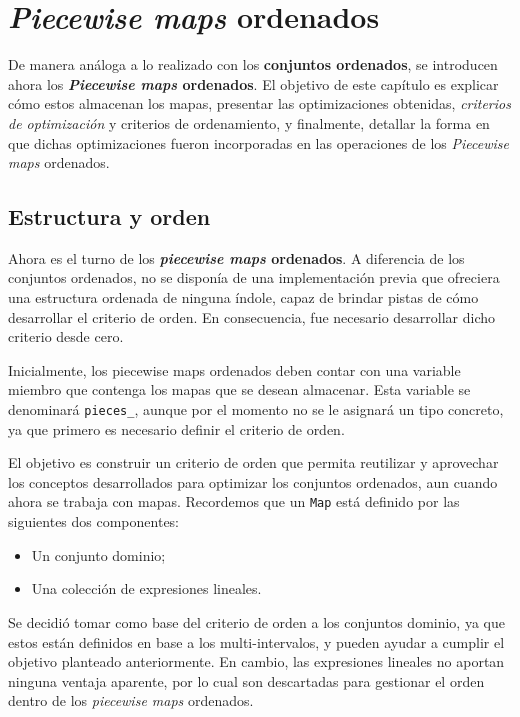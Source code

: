 \chapter{\textit{Piecewise maps} ordenados}

De manera análoga a lo realizado con los \textbf{conjuntos ordenados}, 
se introducen ahora los \textbf{\textit{Piecewise maps} ordenados}. 
El objetivo de este capítulo es explicar cómo estos almacenan los mapas, 
presentar las optimizaciones obtenidas, \textit{criterios de optimización} y criterios de ordenamiento, y finalmente, detallar la forma en que 
dichas optimizaciones fueron incorporadas en las operaciones de los \textit{Piecewise maps} ordenados.

\section{Estructura y orden}

Ahora es el turno de los \textbf{\textit{piecewise maps} ordenados}. A diferencia de los conjuntos ordenados, no se disponía de una implementación previa que ofreciera una estructura ordenada de ninguna índole, capaz de brindar pistas de cómo desarrollar el criterio de orden. En consecuencia, fue necesario desarrollar dicho criterio desde cero.

Inicialmente, los piecewise maps ordenados deben contar con una variable miembro que contenga los mapas que se desean almacenar. Esta variable se denominará \texttt{pieces\_}, aunque por el momento no se le asignará un tipo concreto, ya que primero es necesario definir el criterio de orden.

El objetivo es construir un criterio de orden que permita reutilizar y aprovechar los conceptos desarrollados para optimizar los conjuntos ordenados, aun cuando ahora se trabaja con mapas. Recordemos que un \texttt{Map} está definido por las siguientes dos componentes:

\begin{itemize}
  \item Un conjunto dominio;
  \item Una colección de expresiones lineales.
\end{itemize}

Se decidió tomar como base del criterio de orden a los conjuntos dominio, ya que estos están definidos en base a los multi-intervalos, y pueden ayudar a cumplir el objetivo planteado anteriormente. En cambio, las expresiones lineales no aportan ninguna ventaja aparente, por lo cual son descartadas para gestionar el orden dentro de los \textit{piecewise maps} ordenados.

